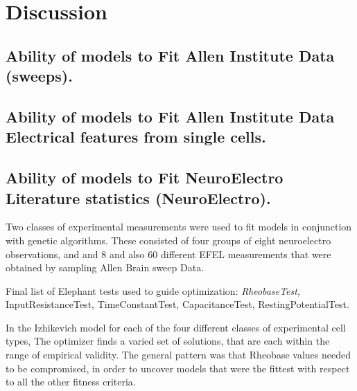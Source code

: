 \section{Discussion}


\subsection{Ability of models to Fit Allen Institute Data (sweeps).}
\subsection{Ability of models to Fit Allen Institute Data Electrical features from single cells.}


\subsection{Ability of models to Fit NeuroElectro Literature statistics (NeuroElectro).}
Two classes of experimental measurements were used to fit models in conjunction with genetic algorithms. These consisted of four groups of eight neuroelectro observations, and and $8$ and also $60$ different EFEL measurements that were obtained by sampling Allen Brain sweep Data.


Final list of Elephant tests used to guide optimization: 
\emph{RheobaseTest}, InputResistanceTest, TimeConstantTest, CapacitanceTest, RestingPotentialTest.


In the Izhikevich model for each of the four different classes of experimental cell types, The optimizer finds a varied set of solutions, that are each within the range of empirical validity. The general pattern was that Rheobase values needed to be compromised, in order to uncover models that were the fittest with respect to all the other fitness criteria.

